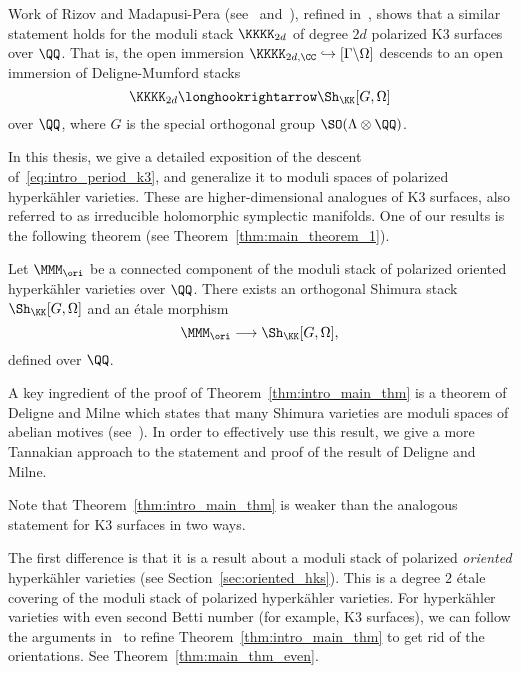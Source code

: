 Work of Rizov and Madapusi-Pera (see~\cite{RizovCM} and~\cite{MadapusiPera}), refined in~\cite{TaelmanShimuraStacks}, shows that a similar statement holds for the moduli stack $\KKKK_{2d}$ of degree $2d$ polarized K3 surfaces over $\QQ$. That is, the open immersion $\KKKK_{2d,\CC} \hookrightarrow [\Gamma \backslash \Omega]$ descends to an open immersion of Deligne-Mumford stacks
\begin{equation}\label{eq:intro_period_k3}
\KKKK_{2d} \longhookrightarrow \Sh_{\KK}[G,\Omega]
\end{equation}
over $\QQ$, where $G$ is the special orthogonal group $\SO(\Lambda \otimes \QQ)$.

In this thesis, we give a detailed exposition of the descent of~\eqref{eq:intro_period_k3}, and generalize it to moduli spaces of polarized hyperk\"ahler varieties. These are higher-dimensional analogues of K3 surfaces, also referred to as irreducible holomorphic symplectic manifolds. One of our results is the following theorem (see Theorem~\ref{thm:main_theorem_1}).
\begin{theorem}\label{thm:intro_main_thm}
Let $\MMM_{\ori}$ be a connected component of the moduli stack of polarized oriented hyperk\"ahler varieties over $\QQ$. There exists an orthogonal Shimura stack $\Sh_{\KK}[G,\Omega]$ and an \'etale morphism 
$$
\MMM_{\ori} \longrightarrow \Sh_{\KK}[G,\Omega],
$$
defined over $\QQ$.
\end{theorem}

A key ingredient of the proof of Theorem~\ref{thm:intro_main_thm} is a theorem of Deligne and Milne which states that many Shimura varieties are moduli spaces of abelian motives (see~\cite{MilneShimuraMotives}). In order to effectively use this result, we give a more Tannakian approach to the statement and proof of the result of Deligne and Milne.

Note that Theorem~\ref{thm:intro_main_thm} is weaker than the analogous statement for K3 surfaces in two ways.

The first difference is that it is a result about a moduli stack of polarized \emph{oriented} hyperk\"ahler varieties (see Section~\ref{sec:oriented_hks}). This is a degree $2$ \'etale covering of the moduli stack of polarized hyperk\"ahler varieties. For hyperk\"ahler varieties with even second Betti number (for example, K3 surfaces), we can follow the arguments in~\cite{TaelmanShimuraStacks} to refine Theorem~\ref{thm:intro_main_thm} to get rid of the orientations. See Theorem~\ref{thm:main_thm_even}.

